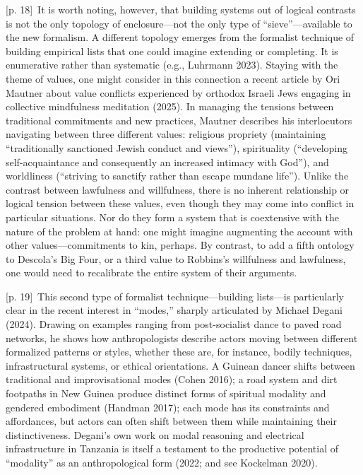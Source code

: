 \documentclass[10pt,a4paper]{article}
\begin{document}
{\scriptsize\color{gray} [p. 18]}\ It is worth noting, however, that building systems out of logical contrasts is not the only topology of enclosure—not the only type of “sieve”—available to the new formalism. A different topology emerges from the formalist technique of building empirical lists that one could imagine extending or completing. It is enumerative rather than systematic (e.g., Luhrmann 2023). Staying with the theme of values, one might consider in this connection a recent article by Ori Mautner about value conflicts experienced by orthodox Israeli Jews engaging in collective mindfulness meditation (2025). In managing the tensions between traditional commitments and new practices, Mautner describes his interlocutors navigating between three different values: religious propriety (maintaining “traditionally sanctioned Jewish conduct and views”), spirituality (“developing self-acquaintance and consequently an increased intimacy with God”), and worldliness (“striving to sanctify rather than escape mundane life”). Unlike the contrast between lawfulness and willfulness, there is no inherent relationship or logical tension between these values, even though they may come into conflict in particular situations. Nor do they form a system that is coextensive with the nature of the problem at hand: one might imagine augmenting the account with other values—commitments to kin, perhaps. By contrast, to add a fifth ontology to Descola’s Big Four, or a third value to Robbins’s willfulness and lawfulness, one would need to recalibrate the entire system of their arguments.\par
{\scriptsize\color{gray} [p. 19]}\ This second type of formalist technique—building lists—is particularly clear in the recent interest in “modes,” sharply articulated by Michael Degani (2024). Drawing on examples ranging from post-socialist dance to paved road networks, he shows how anthropologists describe actors moving between different formalized patterns or styles, whether these are, for instance, bodily techniques, infrastructural systems, or ethical orientations. A Guinean dancer shifts between traditional and improvisational modes (Cohen 2016); a road system and dirt footpaths in New Guinea produce distinct forms of spiritual modality and gendered embodiment (Handman 2017); each mode has its constraints and affordances, but actors can often shift between them while maintaining their distinctiveness. Degani’s own work on modal reasoning and electrical infrastructure in Tanzania is itself a testament to the productive potential of “modality” as an anthropological form (2022; and see Kockelman 2020).\par
\end{document}
